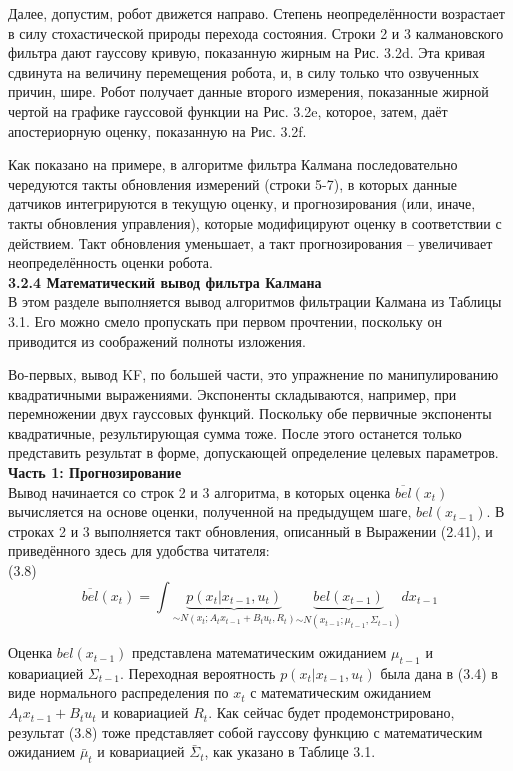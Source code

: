 \documentclass[10pt,a4paper]{article}
\begin{document}
Далее, допустим, робот движется направо. Степень неопределённости возрастает в силу стохастической природы перехода состояния. Строки 2 и 3 калмановского фильтра дают гауссову кривую, показанную жирным на Рис. 3.2d. Эта кривая сдвинута на величину перемещения робота, и, в силу только что озвученных причин, шире. Робот получает данные второго измерения, показанные жирной чертой на графике гауссовой функции на Рис. 3.2e, которое, затем, даёт апостериорную оценку, показанную на Рис. 3.2f.

Как показано на примере, в алгоритме фильтра Калмана последовательно чередуются такты обновления измерений (строки 5-7), в которых данные датчиков интегрируются в текущую оценку, и прогнозирования (или, иначе, такты обновления управления), которые модифицируют оценку в соответствии с действием. Такт обновления уменьшает, а такт прогнозирования – увеличивает неопределённость оценки робота.\\
 
\textbf{3.2.4 Математический вывод фильтра Калмана}\\

В этом разделе выполняется вывод алгоритмов фильтрации Калмана из Таблицы 3.1. Его можно смело пропускать при первом прочтении, поскольку он приводится из соображений полноты изложения.

Во-первых, вывод KF, по большей части, это упражнение по манипулированию квадратичными выражениями. Экспоненты складываются, например, при перемножении двух гауссовых функций. Поскольку обе первичные экспоненты квадратичные, результирующая сумма тоже. После этого останется только представить результат в форме, допускающей определение целевых параметров.\\
 
\textbf{Часть 1: Прогнозирование}\\

Вывод начинается со строк 2 и 3 алгоритма, в которых оценка $\overline{bel}(x_t)$ вычисляется на основе оценки, полученной на предыдущем шаге, $bel(x_{t-1})$. В строках 2 и 3 выполняется такт обновления,  описанный в Выражении (2.41), и приведённого здесь для удобства читателя:\\

(3.8)$$\overline{bel}(x_t)=\int \underbrace{p(x_t|x_{t-1},u_t)}_{\sim N(x_t;A_t x_{t-1}+B_t u_t,R_t)}\underbrace{bel(x_{t-1})}_{\sim N(x_{t-1};\mu_{t-1},\varSigma_{t-1})}dx_{t-1}
$$

Оценка $bel(x_{t-1})$ представлена математическим ожиданием $\mu_{t-1}$ и ковариацией $\varSigma_{t-1}$. Переходная вероятность $p(x_t | x_{t-1}, u_t)$ была дана в (3.4) в виде нормального распределения по $x_t$ с математическим ожиданием $A_t x_{t-1}+B_t u_t$ и ковариацией $R_t$. Как сейчас будет продемонстрировано, результат (3.8) тоже представляет собой гауссову функцию с математическим ожиданием $\bar{\mu}_t$ и ковариацией $\bar{\varSigma}_t$, как указано в Таблице 3.1.
\end{document}
